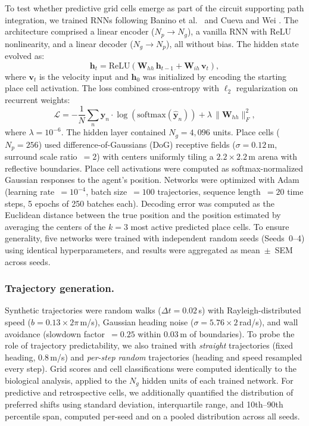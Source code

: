 \documentclass[11pt]{article}
\begin{document}
To test whether predictive grid cells emerge as part of the circuit supporting path integration, we trained RNNs following Banino et al.\ \cite{banino2018} and Cueva and Wei \cite{cueva2018}. The architecture comprised a linear encoder ($N_p \to N_g$), a vanilla RNN with ReLU nonlinearity, and a linear decoder ($N_g \to N_p$), all without bias. The hidden state evolved as:
\begin{equation}
    \mathbf{h}_t = \mathrm{ReLU}\!\left(\mathbf{W}_{hh}\,\mathbf{h}_{t-1} + \mathbf{W}_{ih}\,\mathbf{v}_t\right),
\end{equation}
where $\mathbf{v}_t$ is the velocity input and $\mathbf{h}_0$ was initialized by encoding the starting place cell activation. The loss combined cross-entropy with $\ell_2$ regularization on recurrent weights:
\begin{equation}
    \mathcal{L} = -\frac{1}{N}\sum_n \mathbf{y}_n \cdot \log\!\left(\mathrm{softmax}(\hat{\mathbf{y}}_n)\right) + \lambda\,\lVert\mathbf{W}_{hh}\rVert_F^2,
\end{equation}
where $\lambda = 10^{-6}$. The hidden layer contained $N_g = 4{,}096$ units. Place cells ($N_p = 256$) used difference-of-Gaussians (DoG) receptive fields ($\sigma = 0.12$\,m, surround scale ratio~$= 2$) with centers uniformly tiling a $2.2 \times 2.2$\,m arena with reflective boundaries. Place cell activations were computed as softmax-normalized Gaussian responses to the agent's position. Networks were optimized with Adam (learning rate~$= 10^{-4}$, batch size~$= 100$ trajectories, sequence length~$= 20$ time steps, 5 epochs of 250 batches each). Decoding error was computed as the Euclidean distance between the true position and the position estimated by averaging the centers of the $k = 3$ most active predicted place cells. To ensure generality, five networks were trained with independent random seeds (Seeds~0--4) using identical hyperparameters, and results were aggregated as mean~$\pm$~SEM across seeds.

\subsubsection*{Trajectory generation.}
Synthetic trajectories were random walks ($\Delta t = 0.02$\,s) with Rayleigh-distributed speed ($b = 0.13 \times 2\pi$\,m/s), Gaussian heading noise ($\sigma = 5.76 \times 2$\,rad/s), and wall avoidance (slowdown factor~$= 0.25$ within 0.03\,m of boundaries). To probe the role of trajectory predictability, we also trained with \textit{straight} trajectories (fixed heading, 0.8\,m/s) and \textit{per-step random} trajectories (heading and speed resampled every step). Grid scores and cell classifications were computed identically to the biological analysis, applied to the $N_g$ hidden units of each trained network. For predictive and retrospective cells, we additionally quantified the distribution of preferred shifts using standard deviation, interquartile range, and 10th--90th percentile span, computed per-seed and on a pooled distribution across all seeds.
\end{document}
